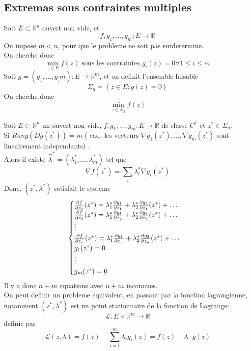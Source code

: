 \documentclass[../main.tex]{subfiles}
\begin{document}
\subsection{Extremas sous contraintes multiples}
Soit $ E \subset \mathbb{R}^n$ ouvert non vide, et 
\[ 
f, g_1, \ldots, g_m : E \to \mathbb{R}
\]
On impose $m<n$, pour que le probleme ne soit pas surdetermine.\\
On cherche donc
\[ 
	\min_{z\in E} f( z) \text{ sous les contraintes } g_i( z) =0 \forall 1 \leq  i \leq  m
\]
Soit $g = (  g_1, \ldots, g_,m) : E \to \mathbb{R}^m$, et on definit l'ensemble faisable
\[ 
	\Sigma_g = \left\{ z \in E : g( z) = 0 \right\} 
\]
On cherche donc
\[ 
	\min_{z \in \Sigma_g} f( z) 
\]
\begin{thm}
	Soit $E \subset \mathbb{R}^n$ un ouvert non vide, $f,g_1, \ldots,g_m: E \to \mathbb{R}$ de classe $C^{1}$ et $z ^{*} \in \Sigma_g$.\\
	Si $ Rang( Dg( z^{*}) ) =m $ ( cad. les vecteurs $\nabla g_1 ( z^{*}) , \ldots, \nabla g_m ( z^{*}) $ sont lineairement independants) .\\
	Alors il existe $\vec{\lambda}^{*} = ( \lambda_1^{*}, \ldots, \lambda_m^{*}) $ tel que
	\[ 
		\nabla f( z^{*}) = \sum_i \lambda_i^{*} \nabla g_i ( z^{*}) 
	\]
	Donc, $( z^{*}, \lambda^{*}) $ satisfait le systeme
	\[ 
	\begin{cases}
		\frac{\partial f}{\partial z_1}( z^{*}) = \lambda_1^{*} \frac{\partial g_1}{\partial z_1} + \lambda_2^{*} \frac{\partial g_2}{\partial z_1}( z^{*} ) + \ldots\\
		\frac{\partial f}{\partial z_2}( z^{*}) = \lambda_1^{*} \frac{\partial g_1}{\partial z_2} + \lambda_2^{*} \frac{\partial g_2}{\partial z_2}( z^{*} ) + \ldots\\
		\vdots\\
		\frac{\partial f}{\partial z_n}( z^{*}) = \lambda_1^{*} \frac{\partial g_1}{\partial z_n} + \lambda_2^{*} \frac{\partial g_2}{\partial z_n}( z^{*} ) + \ldots\\
		g_1 ( z^{*}) = 0\\
		\vdots \\
		g_m ( z^{*}) =0
	\end{cases}
	\]
	Il y a donc $n+m$ equations avec $n+m$ inconnues.\\
	On peut definir un probleme equivalent, en passant par la fonction lagrangienne, notamment
	$ ( z^{*},\lambda^{*}) $ est un point stationnaire de la fonction de Lagrange:
	\[ 
	\mathcal{L}: E \times \mathbb{R}^m \to \mathbb{R}
	\]
	definie par
	\[ 
		\mathcal{L} ( z, \lambda) = f( z) - \sum_{i=1}^{ m} \lambda_i g_i( z) = f( z) - \lambda \cdot g( z) 
	\]
\end{thm}
\end{document}
